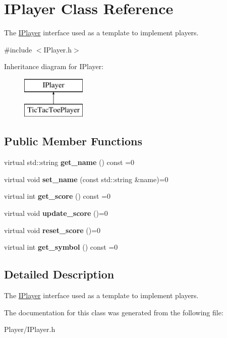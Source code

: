 \hypertarget{class_i_player}{}\section{I\+Player Class Reference}
\label{class_i_player}


The \hyperlink{class_i_player}{I\+Player} interface used as a template to implement players.  




{\ttfamily \#include $<$I\+Player.\+h$>$}

Inheritance diagram for I\+Player\+:\begin{figure}[H]
\begin{center}
\leavevmode
\includegraphics[height=2.000000cm]{class_i_player}
\end{center}
\end{figure}
\subsection*{Public Member Functions}
\begin{DoxyCompactItemize}
\item 
\mbox{\label{class_i_player_a55ac140b5f98671b06a0ca51bd0314a1}} 
virtual std\+::string {\bfseries get\+\_\+name} () const =0
\item 
\mbox{\label{class_i_player_a3c21c9e94e3828adf3a78fe057b22f38}} 
virtual void {\bfseries set\+\_\+name} (const std\+::string \&name)=0
\item 
\mbox{\label{class_i_player_aed92c551c7a7a757ecafbc7b70cd88cf}} 
virtual int {\bfseries get\+\_\+score} () const =0
\item 
\mbox{\label{class_i_player_ad8858145f3d117c7615589f40e6def23}} 
virtual void {\bfseries update\+\_\+score} ()=0
\item 
\mbox{\label{class_i_player_a3dc4f830accf157f1fe84c0736f05e7f}} 
virtual void {\bfseries reset\+\_\+score} ()=0
\item 
\mbox{\label{class_i_player_a16753695f90625ac8fe7538f620525df}} 
virtual int {\bfseries get\+\_\+symbol} () const =0
\end{DoxyCompactItemize}


\subsection{Detailed Description}
The \hyperlink{class_i_player}{I\+Player} interface used as a template to implement players. 

The documentation for this class was generated from the following file\+:\begin{DoxyCompactItemize}
\item 
Player/I\+Player.\+h\end{DoxyCompactItemize}

